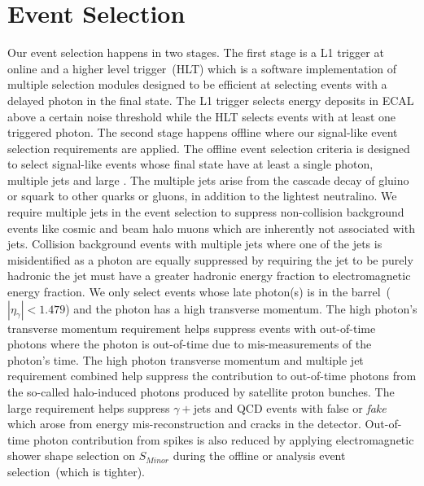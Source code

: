 \section{Event Selection}
Our event selection happens in two stages. The first stage is a L1 trigger at online and a higher level trigger~(HLT) which is a software implementation of multiple selection modules designed to be efficient at selecting events with a delayed photon in the final state. The L1 trigger selects energy deposits in ECAL above a certain noise threshold while the HLT selects events with at least one triggered photon. The second stage happens offline where our signal-like event selection requirements are applied. 
\newline
The offline event selection criteria is designed to select signal-like events whose final state have at least a single photon, multiple jets and large \ETslash\hspace{0.15cm}. The multiple jets arise from the cascade decay of gluino or squark to other quarks or gluons, in addition to the lightest neutralino. We require multiple jets in the event selection to suppress non-collision background events like cosmic and beam halo muons which are inherently not associated with jets.
\newline 
Collision background events with multiple jets where one of the jets is misidentified as a photon are equally suppressed by requiring the jet to be purely hadronic \ie the jet must have a greater hadronic energy fraction to electromagnetic energy fraction. 
\newline
We only select events whose late photon(s) is in the barrel~($|\eta_{\gamma}| < 1.479$) and the photon has a high transverse momentum. The high photon's transverse momentum requirement helps suppress events with out-of-time photons where the photon is out-of-time due to mis-measurements of the photon's time. The high photon transverse momentum and multiple jet requirement combined help suppress the contribution to out-of-time photons from the so-called halo-induced photons produced by satellite proton bunches.
\newline
The large \ETslash\hspace{0.15cm} requirement helps suppress $\gamma + $jets and QCD events with false or \textit{fake} \ETslash\hspace{0.15cm} which arose from energy mis-reconstruction and cracks in the detector. 
Out-of-time photon contribution from spikes is also reduced by applying electromagnetic shower shape selection on $S_{Minor}$ during the offline or analysis event selection~(which is tighter). 
